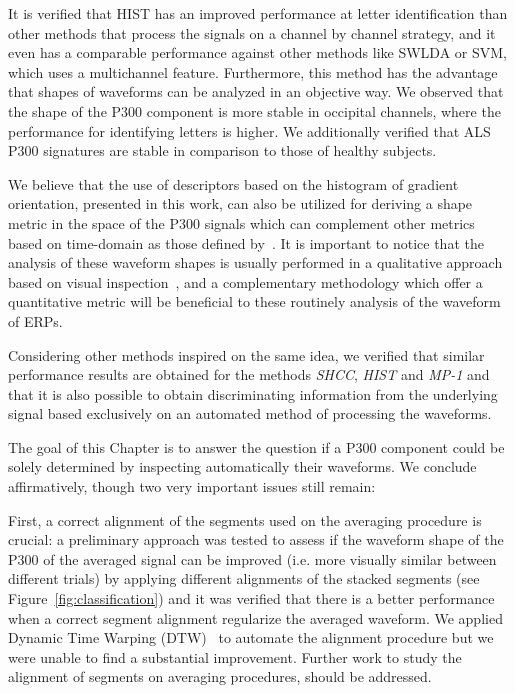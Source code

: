 It is verified that HIST has an improved performance at letter identification than other methods that process the signals on a channel by channel strategy, and it even has a comparable performance against other methods like SWLDA or SVM, which uses a multichannel feature.
Furthermore, this method has the advantage that shapes of waveforms can be analyzed in an objective way.  We observed that the shape of the P300 component is more stable in occipital channels, where the performance for identifying letters is higher.   We additionally verified that ALS P300 signatures are stable in comparison to those of healthy subjects.


We believe that the use of descriptors based on the histogram of gradient orientation, presented in this work, can also be utilized for deriving a shape metric in the space of the P300 signals which can complement other metrics based on time-domain as those defined by~\cite{Mak2012}. It is important to notice that the analysis of these waveform shapes is usually performed in a qualitative approach based on visual inspection~\cite{SellersandEmanuelDonchin2006}, and a complementary methodology which offer a quantitative metric will be beneficial to these routinely analysis of the waveform of ERPs.


Considering other methods inspired on the same idea, we verified that similar performance results are obtained for the methods \textit{SHCC}, \textit{HIST} and \textit{MP-1} and that it is also possible to obtain discriminating information from the underlying signal based exclusively on an automated method of processing the waveforms.  

The goal of this Chapter is to answer the question if a P300 component could be solely determined by inspecting automatically their waveforms.  We conclude affirmatively, though two very important issues still remain:

First, a correct alignment of the segments used on the averaging procedure is crucial: a preliminary approach was tested to assess if the waveform shape of the P300 of the averaged signal can be improved (i.e. more visually similar between different trials) by applying different alignments of the stacked segments (see Figure~\ref{fig:classification}) and it was verified that there is a better performance when a correct segment alignment regularize the averaged waveform.  We applied Dynamic Time Warping (DTW)~\cite{Casarotto2005} to automate the alignment procedure but we were unable to find a substantial improvement.  Further work to study the alignment of segments on averaging procedures,  should be addressed.

